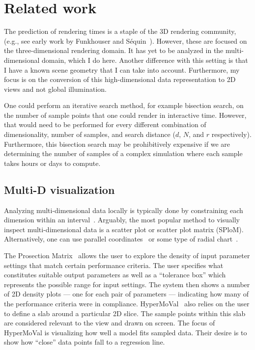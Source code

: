 \section{Related work}
\label{sec:relatedwork}

The prediction of rendering times is a staple of the 3D rendering community,
(e.g., see early work by Funkhouser and
S{\'e}quin~\cite{Funkhouser:1993}).  However, these are focused on the 
three-dimensional
rendering domain. It has yet to be analyzed in the multi-dimensional domain,
which I do here.  
Another difference with this setting is that I have a known scene geometry 
that I can take into account.
Furthermore, my focus is on the conversion of this high-dimensional data representation
to 2D views and not global illumination.

One could perform an iterative search method, for example bisection search, on
the number of sample points that one could render in interactive time. However,
that would need to be performed for every different combination of
dimensionality, number of samples, and search distance ($d$, $N$, and $r$
respectively). Furthermore, this bisection search may be prohibitively
expensive if we are determining the number of samples of a complex simulation
where each sample takes hours or days to compute. 

\subsection{Multi-D visualization}

Analyzing multi-dimensional data locally is typically done by constraining
each dimension within an interval~\cite{Shneiderman:1994}. Arguably, the
most popular method to visually inspect multi-dimensional data is a scatter
plot or scatter plot matrix (SPloM). Alternatively, one can use
parallel
coordinates~\cite{Inselberg:1985} or some type of radial 
chart~\cite{Jayaraman:2002}.

The
Prosection Matrix~\cite{Tweedie:1998} allows the user to explore the density of
input parameter settings that match certain performance criteria. The user
specifies what constitutes suitable output parameters as well as a ``tolerance
box'' which represents the possible range for input settings. The system then
shows a number of 2D density plots --- one for each pair of parameters ---
indicating how many of the performance criteria were in compliance.
HyperMoVal~\cite{Piringer:2010} also relies on the user to define a slab around
a particular 2D slice. The sample points within this slab are considered
relevant to the view and drawn on screen. The focus of HyperMoVal is
visualizing how well a model fits sampled data. Their desire is to show how
``close'' data points fall to a regression line.

